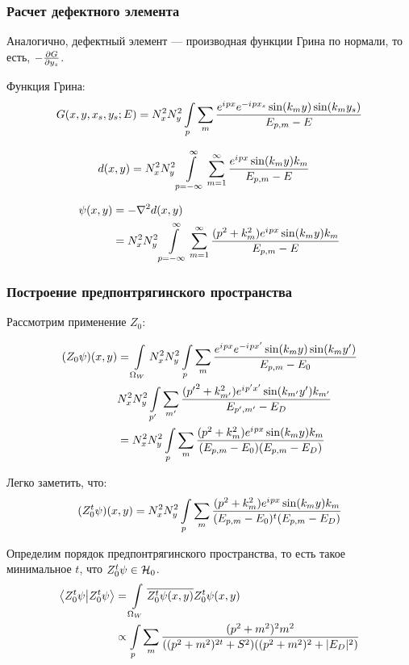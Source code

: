 \subsubsection{Расчет дефектного элемента}
Аналогично, дефектный элемент — производная функции Грина по нормали, то есть, $-\pdv{G}{y_s}$.

Функция Грина:
\[
G(x, y, x_s, y_s; E) = N_x^2 N_y^2 \int\limits_p \sum\limits_m \frac{e^{{i\mkern1mu} p x} e^{-{i\mkern1mu} p x_s} \sin(k_m y) \sin(k_m y_s)}{E_{p, m} - E}
\]

\begin{align*}
d(x, y) 
&= N_x^2 N_y^2 \int\limits_{p = -\infty}^\infty \sum\limits_{m = 1}^\infty \frac{e^{{i\mkern1mu} p x} \sin(k_m y) k_m }{E_{p, m} - E}
\end{align*}

\begin{align*}
\psi(x, y) 
&= -\laplacian d(x, y) \\
&= N_x^2 N_y^2 \int\limits_{p = -\infty}^\infty \sum\limits_{m = 1}^\infty \frac{(p^2 + k_m^2) e^{\iu p x} \sin(k_m y) k_m }{E_{p, m} - E}
\end{align*}

\subsubsection{Построение предпонтрягинского пространства}
Рассмотрим применение $Z_0$:

\begin{align*}
(Z_0 \psi)(x, y)
&= \int\limits_{\Omega_W} N_x^2 N_y^2 \int\limits_p \sum\limits_m \frac{e^{{i\mkern1mu} p x} e^{-{i\mkern1mu} p x'} \sin(k_m y) \sin(k_m y')}{E_{p, m} - E_0} \\
&  N_x^2 N_y^2 \int\limits_{p'} \sum\limits_{m'} \frac{({p'}^2 + k_{m'}^2) e^{{i\mkern1mu} p' x'} \sin(k_{m'} y') k_{m'} }{E_{p', m'} - E_D} \\
&= N_x^2 N_y^2 \int\limits_p \sum\limits_m \frac{(p^2 + k_m^2) e^{{i\mkern1mu} p x} \sin(k_m y) k_m}{(E_{p, m} - E_0) (E_{p, m} - E_D)}
\end{align*}

Легко заметить, что:
\begin{align*}
(Z_0^t \psi)(x, y) =
N_x^2 N_y^2 \int\limits_p \sum\limits_m \frac{(p^2 + k_m^2) e^{{i\mkern1mu} p x} \sin(k_m y) k_m}{(E_{p, m} - E_0)^t (E_{p, m} - E_D)}
\end{align*}

Определим порядок предпонтрягинского пространства, то есть такое минимальное $t$, что $Z_0^t \psi \in \mathcal{H}_{0}$.
\begin{align*}
\ip{Z_0^t \psi}{Z_0^t \psi}
&= \int\limits_{\Omega_W} \cconj{Z_0^t \psi(x, y)} Z_0^t \psi(x, y) \\
&\propto \int\limits_p \sum\limits_m \frac{(p^2 + m^2)^2 m^2}{((p^2 + m^2)^{2t} + S^2 ) ((p^2 + m^2)^2 + |E_D|^2)}
\end{align*}

